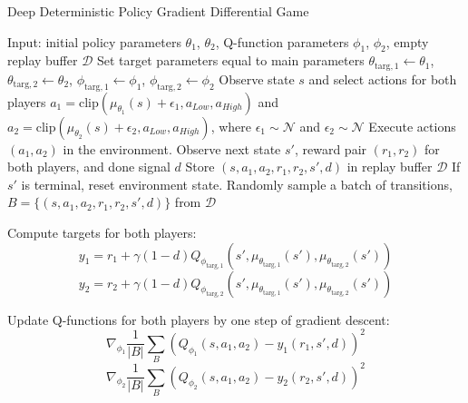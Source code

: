 \documentclass[conference]{IEEEtran}
\begin{document}
\begin{algorithm}[H]
    \caption{Deep Deterministic Policy Gradient Differential Game}
    \label{alg1}
\begin{algorithmic}[1]
    \STATE Input: initial policy parameters $\theta_1$, $\theta_2$, Q-function parameters $\phi_1$, $\phi_2$, empty replay buffer $\mathcal{D}$
    \STATE Set target parameters equal to main parameters $\theta_{\text{targ},1} \leftarrow \theta_1$, $\theta_{\text{targ},2} \leftarrow \theta_2$, $\phi_{\text{targ},1} \leftarrow \phi_1$, $\phi_{\text{targ},2} \leftarrow \phi_2$
    \REPEAT
        \STATE Observe state $s$ and select actions for both players $a_1 = \text{clip}(\mu_{\theta_1}(s) + \epsilon_1, a_{Low}, a_{High})$ and $a_2 = \text{clip}(\mu_{\theta_2}(s) + \epsilon_2, a_{Low}, a_{High})$, where $\epsilon_1 \sim \mathcal{N}$ and $\epsilon_2 \sim \mathcal{N}$
        \STATE Execute actions $(a_1, a_2)$ in the environment.
        \STATE Observe next state $s'$, reward pair $(r_1, r_2)$ for both players, and done signal $d$
        \STATE Store $(s, a_1, a_2, r_1, r_2, s', d)$ in replay buffer $\mathcal{D}$
        \STATE If $s'$ is terminal, reset environment state.
                \STATE Randomly sample a batch of transitions, $B = \{ (s, a_1, a_2, r_1, r_2, s', d) \}$ from $\mathcal{D}$

                \STATE Compute targets for both players:
                \begin{equation*}
                    y_1 = r_1 + \gamma (1 - d) Q_{\phi_{\text{targ},1}}(s', \mu_{\theta_{\text{targ},1}}(s'), \mu_{\theta_{\text{targ},2}}(s'))
                \end{equation*}
                \begin{equation*}
                    y_2 = r_2 + \gamma (1 - d) Q_{\phi_{\text{targ},2}}(s', \mu_{\theta_{\text{targ},1}}(s'), \mu_{\theta_{\text{targ},2}}(s'))
                \end{equation*}

                \STATE Update Q-functions for both players by one step of gradient descent:
                \begin{equation*}
                    \nabla_{\phi_1} \frac{1}{|B|} \sum_{B} \left( Q_{\phi_1}(s, a_1, a_2) - y_1(r_1, s', d) \right)^2
                \end{equation*}
                \begin{equation*}
                    \nabla_{\phi_2} \frac{1}{|B|} \sum_{B} \left( Q_{\phi_2}(s, a_1, a_2) - y_2(r_2, s', d) \right)^2
                \end{equation*}


\end{algorithmic}
\end{algorithm}
\end{document}
